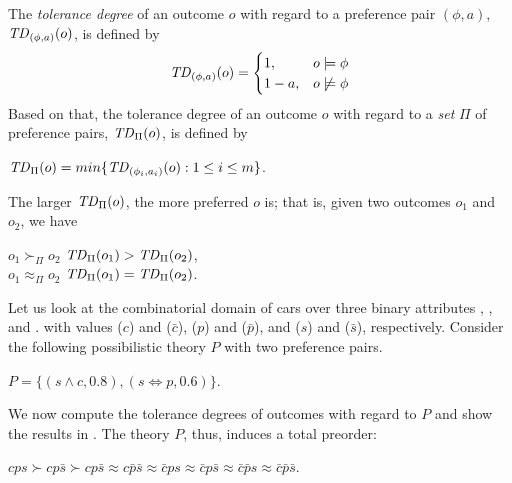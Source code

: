 The \textit{tolerance degree} of an outcome $o$ with regard to a preference 
pair $(\phi,a)$, $\mathit{TD}_{(\phi,a)}(o)$, is defined by
\[
 \mathit{TD}_{(\phi,a)}(o) =
  \begin{cases}
   1, & o \models \phi \\
   1-a, & o \not \models \phi
  \end{cases}
\]
Based on that, the tolerance degree of an outcome $o$ with regard to a \emph{set}
$\Pi$ of preference pairs, $\mathit{TD}_\Pi(o)$, is defined by 
\begin{center}
	$\mathit{TD}_\Pi(o)=min\{\mathit{TD}_{(\phi_i,a_i)}(o):1\leq i \leq m\}$.
\end{center}
The larger $\mathit{TD}_\Pi(o)$, the more preferred $o$ is; that is, 
given two outcomes $o_1$ and $o_2$, we have
\begin{center}
	$o_1 \succ_\Pi o_2$ \itiff $\mathit{TD}_\Pi(o_1) > \mathit{TD}_\Pi(o_2)$,\\
	$o_1 \approx_\Pi o_2$ \itiff $\mathit{TD}_\Pi(o_1) = \mathit{TD}_\Pi(o_2)$.
\end{center}

Let us look at the combinatorial domain of cars 
over three binary attributes
, , and .
with values  ($c$) and  ($\bar{c}$),
 ($p$) and  ($\bar{p}$), and
 ($s$) and  ($\bar{s}$), respectively.
Consider the following possibilistic theory $P$ with
two preference pairs.
\begin{center}
	$P = \{ (s\land c,0.8), (s \Leftrightarrow p,0.6) \}$.
\end{center}
We now compute the tolerance degrees of outcomes with regard to $P$
and show the results in .
The theory $P$, thus, induces a total preorder:
\begin{center}
	$cps \succ cp\bar{s} \succ cp\bar{s} \approx c\bar{p}\bar{s} \approx 
		\bar{c} ps \approx \bar{c} p\bar{s} \approx \bar{c} \bar{p} s \approx \bar{c} \bar{p} \bar{s}$.
\end{center}

